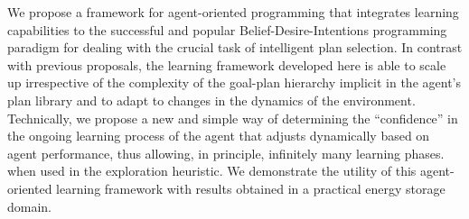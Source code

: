 


We propose a framework for agent-oriented programming that integrates learning capabilities to the successful and popular Belief-Desire-Intentions programming paradigm for dealing with the crucial task of intelligent plan selection.
In contrast with previous proposals, the learning framework developed here is able to scale up irrespective of the complexity of the goal-plan hierarchy implicit in the agent's plan library and to adapt to changes in the dynamics of the environment.
Technically, we propose a new and simple way of determining the ``confidence'' in the ongoing learning process of the agent that adjusts dynamically based on agent performance, thus allowing, in principle, infinitely many learning phases. when used in the exploration heuristic. 
%
We demonstrate the utility of this agent-oriented learning framework with results obtained in a practical energy storage domain.


% 
% 
% 
